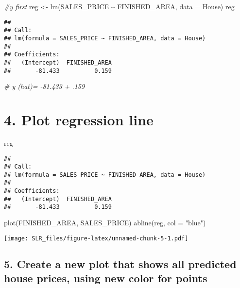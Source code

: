 \documentclass[
]{article}
\newenvironment{Shaded}{\begin{snugshade}}{\end{snugshade}}
\newcommand{\AttributeTok}[1]{\textcolor[rgb]{0.77,0.63,0.00}{#1}}
\newcommand{\CommentTok}[1]{\textcolor[rgb]{0.56,0.35,0.01}{\textit{#1}}}
\newcommand{\FunctionTok}[1]{\textcolor[rgb]{0.00,0.00,0.00}{#1}}
\newcommand{\NormalTok}[1]{#1}
\newcommand{\OtherTok}[1]{\textcolor[rgb]{0.56,0.35,0.01}{#1}}
\newcommand{\SpecialCharTok}[1]{\textcolor[rgb]{0.00,0.00,0.00}{#1}}
\newcommand{\StringTok}[1]{\textcolor[rgb]{0.31,0.60,0.02}{#1}}
\begin{document}
\begin{Shaded}
\begin{Highlighting}[]
\CommentTok{\#y first}
\NormalTok{reg }\OtherTok{\textless{}{-}} \FunctionTok{lm}\NormalTok{(SALES\_PRICE }\SpecialCharTok{\textasciitilde{}}\NormalTok{ FINISHED\_AREA, }\AttributeTok{data =}\NormalTok{ House)}
\NormalTok{reg}
\end{Highlighting}
\end{Shaded}

\begin{verbatim}
## 
## Call:
## lm(formula = SALES_PRICE ~ FINISHED_AREA, data = House)
## 
## Coefficients:
##   (Intercept)  FINISHED_AREA  
##       -81.433          0.159
\end{verbatim}

\begin{Shaded}
\begin{Highlighting}[]
\CommentTok{\# y (hat)= {-}81.433 + .159}
\end{Highlighting}
\end{Shaded}

\hypertarget{plot-regression-line}{%
\section{4. Plot regression line}\label{plot-regression-line}}

\begin{Shaded}
\begin{Highlighting}[]
\NormalTok{reg}
\end{Highlighting}
\end{Shaded}

\begin{verbatim}
## 
## Call:
## lm(formula = SALES_PRICE ~ FINISHED_AREA, data = House)
## 
## Coefficients:
##   (Intercept)  FINISHED_AREA  
##       -81.433          0.159
\end{verbatim}

\begin{Shaded}
\begin{Highlighting}[]
\FunctionTok{plot}\NormalTok{(FINISHED\_AREA, SALES\_PRICE)}
\FunctionTok{abline}\NormalTok{(reg, }\AttributeTok{col =} \StringTok{"blue"}\NormalTok{)}
\end{Highlighting}
\end{Shaded}

\texttt{[image: SLR\_files/figure-latex/unnamed-chunk-5-1.pdf]}

\hypertarget{create-a-new-plot-that-shows-all-predicted-house-prices-using-new-color-for-points}{%
\subsection{5. Create a new plot that shows all predicted house prices,
using new color for
points}\label{create-a-new-plot-that-shows-all-predicted-house-prices-using-new-color-for-points}}
\end{document}
